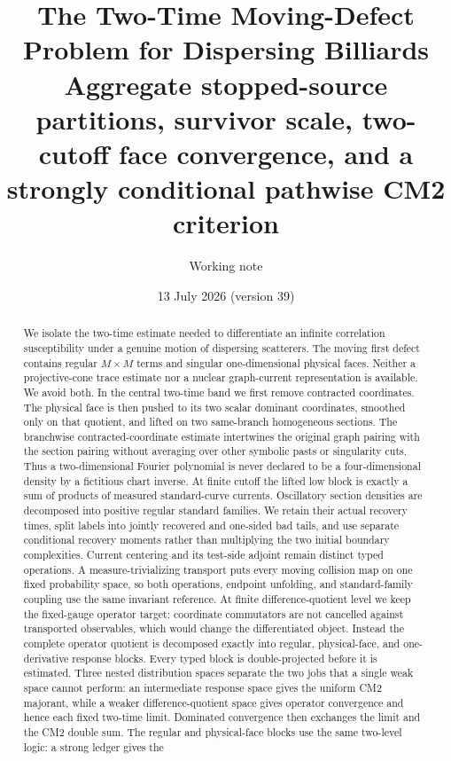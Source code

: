 \documentclass[11pt]{article}
\title{The Two-Time Moving-Defect Problem for Dispersing Billiards\\
\large Aggregate stopped-source partitions, survivor scale,
two-cutoff face convergence, and a strongly conditional
pathwise CM2 criterion}
\author{Working note}
\date{13 July 2026 (version 39)}
\begin{document}
\maketitle

\begin{abstract}
We isolate the two-time estimate needed to differentiate an infinite
correlation susceptibility under a genuine motion of dispersing scatterers.
The moving first defect contains regular $M\times M$ terms and singular
one-dimensional physical faces.  Neither a projective-cone trace estimate nor
a nuclear graph-current representation is available.  We avoid both.  In the
central two-time band we first remove contracted coordinates.  The physical
face is then pushed to its two scalar dominant coordinates, smoothed only on
that quotient, and lifted on two same-branch homogeneous sections.  The
branchwise contracted-coordinate estimate intertwines the original graph
pairing with the section pairing without averaging over other symbolic pasts
or singularity cuts.  Thus a two-dimensional Fourier polynomial is never
declared to be a four-dimensional density by a fictitious chart inverse.  At
finite cutoff the lifted low block is exactly a sum of products of measured
standard-curve currents.  Oscillatory section densities are decomposed into
positive regular standard families.  We retain their actual recovery times,
split labels into jointly recovered and one-sided bad tails, and use separate
conditional recovery moments rather than multiplying the two initial boundary
complexities.  Current centering and its test-side adjoint remain
distinct typed operations.  A measure-trivializing transport puts every
moving collision map on one fixed probability space, so both operations,
endpoint unfolding, and standard-family coupling use the same invariant
reference.  At finite difference-quotient level we keep the fixed-gauge
operator target: coordinate commutators are not cancelled against transported
observables, which would change the differentiated object.  Instead the
complete operator quotient is decomposed exactly into regular, physical-face,
and one-derivative response blocks.  Every typed block is double-projected
before it is estimated.  Three nested distribution spaces separate the two
jobs that a single weak space cannot perform: an intermediate response space
gives the uniform CM2 majorant, while a weaker difference-quotient space gives
operator convergence and hence each fixed two-time limit.  Dominated
convergence then exchanges the limit and the CM2 double sum.  The regular and
physical-face blocks use the same two-level logic: a strong ledger gives the

\end{abstract}
\end{document}
